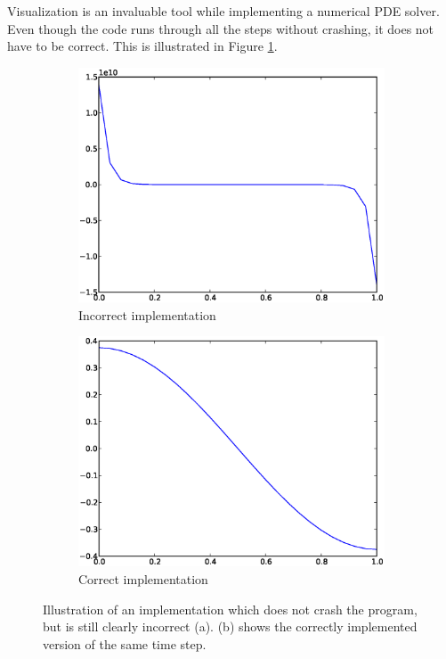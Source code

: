 Visualization is an invaluable tool while implementing a numerical PDE solver. 
Even though the code runs through all the steps without crashing, it does not have to be correct. 
This is illustrated in Figure \ref{appendix:visual_debugging}.
\begin{figure}[H]
 \centering
 \begin{subfigure}[t]{0.48\textwidth}
  \includegraphics[width=\textwidth]{Figures/incorrect_implementation.eps}
  \caption{Incorrect implementation}
 \end{subfigure}
 \begin{subfigure}[t]{0.48\textwidth}
  \includegraphics[width=\textwidth]{Figures/correct_implementation.eps}
  \caption{Correct implementation}
 \end{subfigure}
 \caption[Visual debugging]{Illustration of an implementation which does not crash the program, but is still clearly incorrect (a). (b) shows the correctly implemented version of the same time step.}
 \label{appendix:visual_debugging}
\end{figure}

